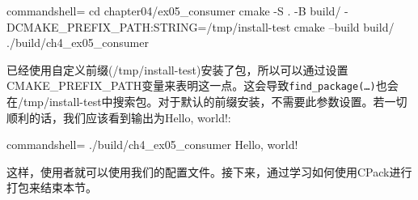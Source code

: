 \begin{tcblisting}{commandshell={}}
cd chapter04/ex05_consumer
cmake -S . -B build/ -DCMAKE_PREFIX_PATH:STRING=/tmp/install-test
cmake --build build/
./build/ch4_ex05_consumer
\end{tcblisting}

已经使用自定义前缀(/tmp/install-test)安装了包，所以可以通过设置CMAKE\_PREFIX\_PATH变量来表明这一点。这会导致\texttt{find\_package(…)}也会在/tmp/install-test中搜索包。对于默认的前缀安装，不需要此参数设置。若一切顺利的话，我们应该看到输出为Hello, world!: 

\begin{tcblisting}{commandshell={}}
./build/ch4_ex05_consumer
Hello, world!
\end{tcblisting}

这样，使用者就可以使用我们的配置文件。接下来，通过学习如何使用CPack进行打包来结束本节。



























